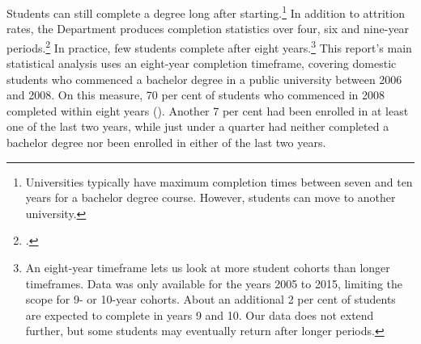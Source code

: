 Students can still complete a degree long after starting.\footnote{Universities typically have maximum completion times between seven and ten years for a bachelor degree course. However, students can move to another university.} 
In addition to attrition rates, the Department produces completion statistics over four, six and nine-year periods.\footcite{DepartmentofEducationandTraining2017} 
In practice, few students complete after eight years.\footnote{An eight-year timeframe lets us look at more student cohorts than longer timeframes. Data was only available for the years 2005 to 2015, limiting the scope for 9- or 10-year cohorts. About an additional 2 per cent of students are expected to complete in years 9 and 10. Our data does not extend further, but some students may eventually return after longer periods.} 
This report's main statistical analysis uses an eight-year completion timeframe, covering domestic students who commenced a bachelor degree in a public university between 2006 and 2008. On this measure, 70 per cent of students who commenced in 2008 completed within eight years (). Another 7 per cent had been enrolled in at least one of the last two years, while just under a quarter had neither completed a bachelor degree nor been enrolled in either of the last two years.

